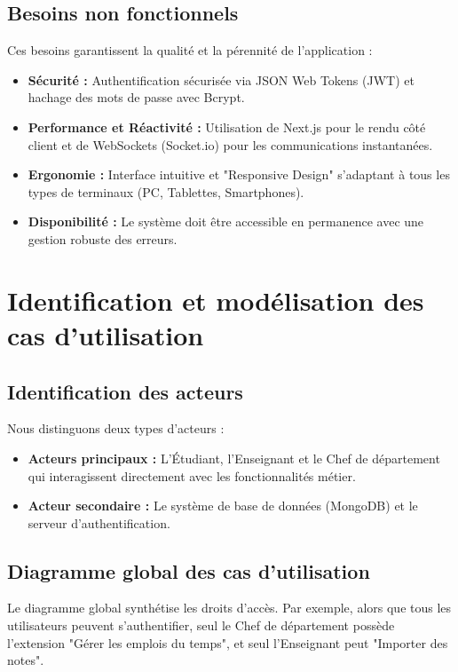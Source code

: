 \subsection{Besoins non fonctionnels}
Ces besoins garantissent la qualité et la pérennité de l'application :
\begin{itemize}
    \item \textbf{Sécurité :} Authentification sécurisée via JSON Web Tokens (JWT) et hachage des mots de passe avec Bcrypt.
    \item \textbf{Performance et Réactivité :} Utilisation de Next.js pour le rendu côté client et de WebSockets (Socket.io) pour les communications instantanées.
    \item \textbf{Ergonomie :} Interface intuitive et "Responsive Design" s'adaptant à tous les types de terminaux (PC, Tablettes, Smartphones).
    \item \textbf{Disponibilité :} Le système doit être accessible en permanence avec une gestion robuste des erreurs.
\end{itemize}

\section{Identification et modélisation des cas d’utilisation}

\subsection{Identification des acteurs}
Nous distinguons deux types d'acteurs :
\begin{itemize}
    \item \textbf{Acteurs principaux :} L'Étudiant, l'Enseignant et le Chef de département qui interagissent directement avec les fonctionnalités métier.
    \item \textbf{Acteur secondaire :} Le système de base de données (MongoDB) et le serveur d'authentification.
\end{itemize}

\subsection{Diagramme global des cas d’utilisation}
Le diagramme global synthétise les droits d'accès. Par exemple, alors que tous les utilisateurs peuvent s'authentifier, seul le Chef de département possède l'extension "Gérer les emplois du temps", et seul l'Enseignant peut "Importer des notes".

